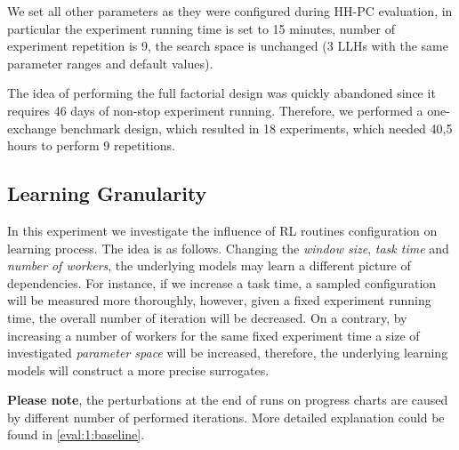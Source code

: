 We set all other parameters as they were configured during HH-PC evaluation, in particular the experiment running time is set to 15 minutes, number of experiment repetition is 9, the search space is unchanged (3 LLHs with the same parameter ranges and default values).

The idea of performing the full factorial design was quickly abandoned since it requires 46 days of non-stop experiment running.
Therefore, we performed a one-exchange benchmark design, which resulted in 18 experiments, which needed 40,5 hours to perform 9 repetitions.

\subsection{Learning Granularity}\label{eval:2:learning granularity}
In this experiment we investigate the influence of RL routines configuration on learning process. The idea is as follows. Changing the \emph{window size}, \emph{task time} and \emph{number of workers}, the underlying models may learn a different picture of dependencies. For instance, if we increase a task time, a sampled configuration will be measured more thoroughly, however, given a fixed experiment running time, the overall number of iteration will be decreased. On a contrary, by increasing a number of workers for the same fixed experiment time a size of investigated \emph{parameter space} will be increased, therefore, the underlying learning models will construct a more precise surrogates.

\textbf{Please note}, the perturbations at the end of runs on progress charts are caused by different number of performed iterations. More detailed explanation could be found in \cref{eval:1:baseline}.

